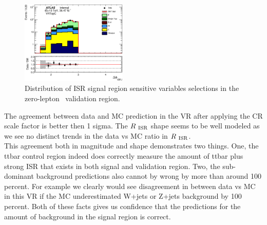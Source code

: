 \begin{figure}[htbp]
        \includegraphics[width=0.45\textwidth]{figures/ttbar/postfit/CA_dphiISRI_VRTopC_log}
  \caption{\label{fig:ttbar0Lep1bVRISR}{Distribution of ISR signal region
      sensitive variables selections in the zero-lepton \ttbar\ validation
      region.}}
\end{figure}

\indent The agreement between data and MC prediction in the VR after applying the CR scale factor is better then 1 sigma.  The $R_{~\mathrm{ISR}}$  shape seems to be well modeled as we see no distinct trends in the data vs MC ratio in $R_{~\mathrm{ISR}}$. \\
\indent This agreement both in magnitude and shape demonstrates two things.  One, the ttbar control region indeed does correctly measure the amount of ttbar plus strong ISR that exists in both signal and validation region.  Two, the sub-dominant background predictions also cannot by wrong by more than around 100 percent.  For example we clearly would see disagreement in between data vs MC in this VR if the MC underestimated W+jets or Z+jets background by 100 percent.  Both of these facts gives us confidence that the predictions for the amount of background in the signal region is correct. \\